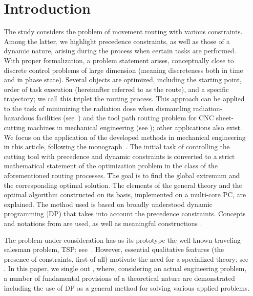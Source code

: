 \documentclass[numbers,sort&compress]{IntechOpen-Book}%
\begin{document}
\section{Introduction}
\label{sec:intro}

The study considers the problem of movement routing
with various constraints.
Among the latter, we highlight
precedence constraints,
as well as those of a dynamic nature,
arising during the process when certain tasks are performed.
With proper formalization, a problem statement arises,
conceptually close to discrete control problems of large dimension
(meaning discreteness both in time and in phase state).
Several objects are optimized,
including the starting point,
order of task execution
(hereinafter referred to as the route),
and a specific trajectory;
we call this triplet
the routing process.
This approach can be applied
to the task of minimizing the radiation dose
when dismantling radiation-hazardous facilities
(see~\cite {1,3})
and the tool path routing problem
for CNC sheet-cutting machines
in mechanical engineering (see \cite {4,5});
other applications also exist.
We focus on the application of the developed methods in mechanical engineering
in this article,
following the monograph~\cite{4}.
The initial task of controlling the cutting tool
with precedence and dynamic constraints
is converted to a strict mathematical statement of
the optimization problem
in the class of the aforementioned routing processes.
The goal is to find
the global extremum and the corresponding optimal solution.
The elements of the general theory and
the optimal algorithm constructed on its basis,
implemented on a multi-core PC,
are explained.
The method used is based on
broadly understood dynamic programming
(DP)
that takes into account the precedence constraints.
Concepts and notations from
\cite[part II]{4}
are used,
as well as
meaningful constructions
\cite[part I]{4}.

The problem under consideration
has as its prototype the well-known
traveling salesman problem,
TSP;
see~\cite{7,8,9,10,11,12}.
However, essential qualitative features
(the presence of constraints, first of all)
motivate the need for a specialized theory;
see \cite {1,3,4,5,14}.
In this paper,
we single out \cite{4},
where, considering an actual engineering problem,
a number of fundamental provisions of a theoretical nature
are demonstrated including the use of DP
as a general method for solving various applied problems.
\end{document}
